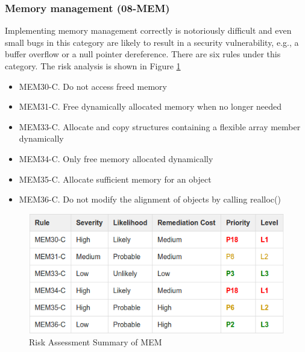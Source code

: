 \subsubsection{Memory management (08-MEM)}  Implementing memory management correctly is notoriously difficult and even small bugs in this category are likely to result in a security vulnerability, e.g., a buffer overflow or a null pointer dereference. There are six rules under this category. The risk analysis is shown in Figure \ref{fig:9}\cite{cert-c}
\begin{itemize}
	\item MEM30-C. Do not access freed memory
	
	\item MEM31-C. Free dynamically allocated memory when no longer needed
	
	\item MEM33-C. Allocate and copy structures containing a flexible array member dynamically
	
	\item MEM34-C. Only free memory allocated dynamically
	
	\item MEM35-C. Allocate sufficient memory for an object
	
	\item MEM36-C. Do not modify the alignment of objects by calling realloc()
	
\end{itemize}
\begin{figure}[H]
	
	
	\centering
	\includegraphics[width=.6\linewidth]{Figures/mem}
	\caption{Risk Assessment Summary of MEM}
	\label{fig:9}
	
\end{figure}
